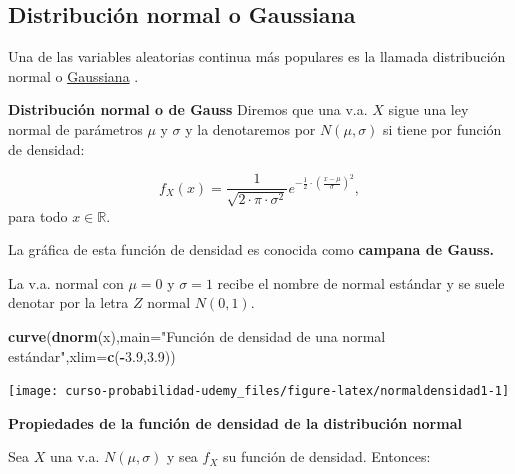 \documentclass[]{book}
\newenvironment{Shaded}{\begin{snugshade}}{\end{snugshade}}
\newcommand{\DataTypeTok}[1]{\textcolor[rgb]{0.13,0.29,0.53}{#1}}
\newcommand{\FloatTok}[1]{\textcolor[rgb]{0.00,0.00,0.81}{#1}}
\newcommand{\KeywordTok}[1]{\textcolor[rgb]{0.13,0.29,0.53}{\textbf{#1}}}
\newcommand{\NormalTok}[1]{#1}
\newcommand{\OperatorTok}[1]{\textcolor[rgb]{0.81,0.36,0.00}{\textbf{#1}}}
\newcommand{\StringTok}[1]{\textcolor[rgb]{0.31,0.60,0.02}{#1}}
\begin{document}
\hypertarget{distribuciuxf3n-normal-o-gaussiana}{%
\subsection{Distribución normal o Gaussiana}\label{distribuciuxf3n-normal-o-gaussiana}}

Una de las variables aleatorias continua más populares es la llamada distribución normal o \href{https://es.wikipedia.org/wiki/Distribuci\%C3\%B3n_normal}{Gaussiana} .

 \textbf{Distribución normal o de Gauss}
Diremos que una v.a. \(X\) sigue una ley normal de parámetros
\(\mu\) y \(\sigma\) y la denotaremos por \(N(\mu,\sigma)\)
si tiene por función de densidad:

\[
f_{X}(x)=\frac1{\sqrt{2\cdot\pi\cdot\sigma^2}}
e^{-\frac{1}{2}\cdot\left(\frac{x-\mu}{\sigma}\right)^2},
\]
para todo \(x\in \mathbb{R}.\)

La gráfica de esta función de densidad es conocida como \textbf{campana de Gauss.}

La v.a. normal con \(\mu=0\) y \(\sigma=1\) recibe el nombre de
normal estándar y se suele denotar por la letra \(Z\) normal \(N(0,1)\).

\begin{Shaded}
\begin{Highlighting}[]
\KeywordTok{curve}\NormalTok{(}\KeywordTok{dnorm}\NormalTok{(x),}\DataTypeTok{main=}\StringTok{"Función de densidad de una normal estándar"}\NormalTok{,}\DataTypeTok{xlim=}\KeywordTok{c}\NormalTok{(}\OperatorTok{-}\FloatTok{3.9}\NormalTok{,}\FloatTok{3.9}\NormalTok{))}
\end{Highlighting}
\end{Shaded}

\begin{center}\texttt{[image: curso-probabilidad-udemy\_files/figure-latex/normaldensidad1-1]} \end{center}

 \textbf{Propiedades de la función de densidad de la distribución normal}

Sea \(X\) una v.a. \(N(\mu,\sigma)\) y sea \(f_{X}\) su función de densidad. Entonces:
\end{document}
